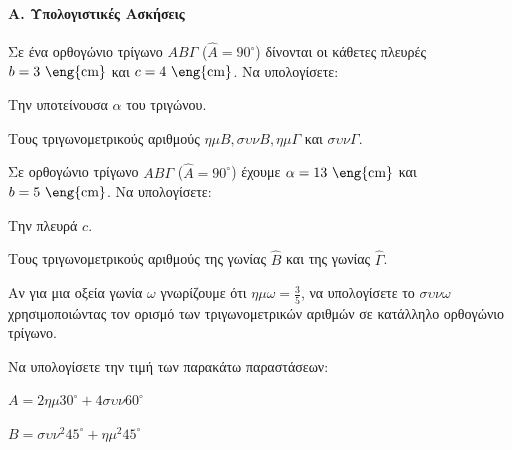 \documentclass[11pt,a4paper,modern]{FFExercises}
\begin{document}

\paragraph{Α. Υπολογιστικές Ασκήσεις}

\askhsh
Σε ένα ορθογώνιο τρίγωνο $AB\varGamma$ ($\hat{A}=90^\circ$) δίνονται οι κάθετες πλευρές $b=3\text{ \eng{cm}}$ και $c=4\text{ \eng{cm}}$. Να υπολογίσετε:
\begin{alist}
    \item Την υποτείνουσα $\alpha$ του τριγώνου.
    \item Τους τριγωνομετρικούς αριθμούς $\eta\mu B, \sigma\upsilon\nu B, \eta\mu \Gamma$ και $\sigma\upsilon\nu \Gamma$.
\end{alist}
\begin{center}
\end{center}

\askhsh
Σε ορθογώνιο τρίγωνο $AB\varGamma$ ($\hat{A}=90^\circ$) έχουμε $\alpha=13\text{ \eng{cm}}$ και $b=5\text{ \eng{cm}}$. Να υπολογίσετε:
\begin{alist}
    \item Την πλευρά $c$.
    \item Τους τριγωνομετρικούς αριθμούς της γωνίας $\hat{B}$ και της γωνίας $\hat{\Gamma}$.
\end{alist}

\askhsh
Αν για μια οξεία γωνία $\omega$ γνωρίζουμε ότι $\eta\mu \omega = \frac{3}{5}$, να υπολογίσετε το $\sigma\upsilon\nu \omega$ χρησιμοποιώντας τον ορισμό των τριγωνομετρικών αριθμών σε κατάλληλο ορθογώνιο τρίγωνο.

\askhsh
Να υπολογίσετε την τιμή των παρακάτω παραστάσεων:
\begin{alist}
    \item $A = 2\eta\mu 30^\circ + 4\sigma\upsilon\nu 60^\circ$
    \item $B = \sigma\upsilon\nu^2 45^\circ + \eta\mu^2 45^\circ$
\end{alist}
\end{document}
